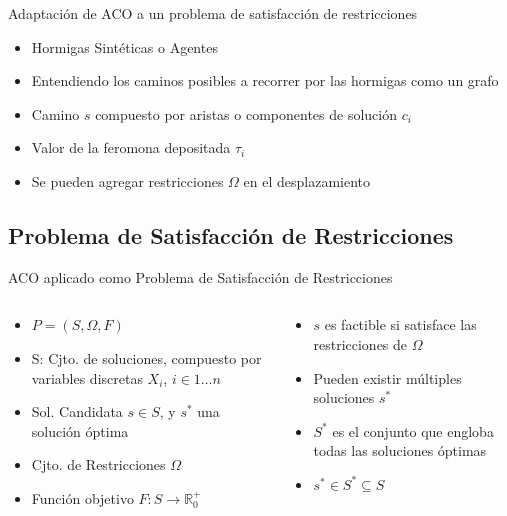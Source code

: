 \begin{frame}{Adaptaci\'on de ACO a un problema de satisfacci\'on de restricciones}
    \begin{itemize}
        \item Hormigas Sint\'eticas o Agentes
        \item Entendiendo los caminos posibles a recorrer por las hormigas como un grafo
        \item Camino $s$ compuesto por aristas o componentes de soluci\'on $c_i$
        \item Valor de la feromona depositada $\tau_{i}$
        \item Se pueden agregar restricciones $\Omega$ en el desplazamiento
    \end{itemize}
\end{frame}

\subsection{Problema de Satisfacci\'on de Restricciones}
\begin{frame}{ACO aplicado como Problema de Satisfacci\'on de Restricciones}
  \begin{columns}
    \begin{column}{0.5\textwidth}
        \begin{itemize}
          \item $P = (S, \Omega, F)$
          \item S:  Cjto. de soluciones, compuesto por variables discretas $X_{i}$, $i \in 1 \dotsc n$
          \item Sol. Candidata $s \in S$, y $s^{*}$ una soluci\'on \'optima
          \item Cjto. de Restricciones $\Omega$
          \item Funci\'on objetivo $F: S\rightarrow \mathbb R_{0}^{+}$
          
      \end{itemize}
    \end{column}
    \begin{column}{0.5\textwidth}
      \begin{itemize}
          \item $s$ es factible si satisface las restricciones de $\Omega$
          \item Pueden existir m\'ultiples soluciones $s^{*}$
          \item $S^{*}$ es el conjunto que engloba todas las soluciones \'optimas
          \item $s^{*} \in S^{*} \subseteq S$
      \end{itemize}
    \end{column}
\end{columns}
\end{frame}



